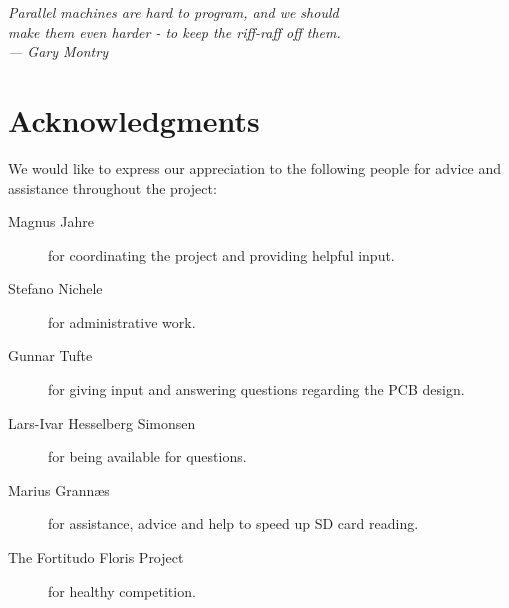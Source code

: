 
\begin{flushright}{\slshape
    Parallel machines are hard to program, and we should\\
    make them even harder - to keep the riff-raff off them.\\ \medskip
    ---  Gary Montry}  %
\end{flushright}

\bigskip

\begingroup
\let\clearpage\relax
\let\cleardoublepage\relax
\let\cleardoublepage\relax
\chapter*{Acknowledgments}
\bigskip

We would like to express our appreciation to the following people for
advice and assistance throughout the project:

\begin{description} %
\item[Magnus Jahre] for coordinating the project and providing helpful input.
\item[Stefano Nichele] for administrative work. 
\item[Gunnar Tufte] for giving input and answering questions regarding the PCB
design.
\item[Lars-Ivar Hesselberg Simonsen] for being available for questions.
\item[Marius Grann{\ae}s] for assistance, advice and help to speed up SD
card reading.
\item[The Fortitudo Floris Project] for healthy competition.
\end{description}
\endgroup
